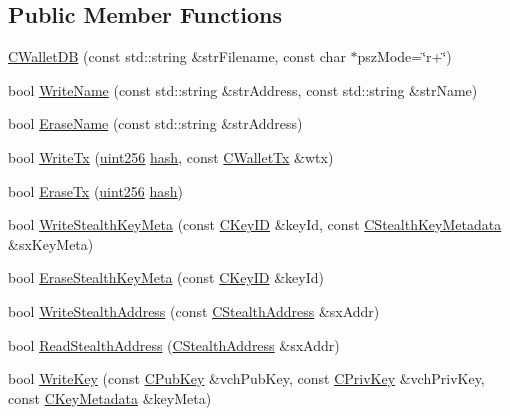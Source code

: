 \subsection*{Public Member Functions}
\begin{DoxyCompactItemize}
\item 
\hyperlink{class_c_wallet_d_b_abb8766ee5b03e8115438726c625f88a7}{C\+Wallet\+D\+B} (const std\+::string \&str\+Filename, const char $\ast$psz\+Mode=\char`\"{}r+\char`\"{})
\item 
bool \hyperlink{class_c_wallet_d_b_ad1b3bce77e9dd6ddd8c668a469c38f0a}{Write\+Name} (const std\+::string \&str\+Address, const std\+::string \&str\+Name)
\item 
bool \hyperlink{class_c_wallet_d_b_a319209fcf90ea860b668b92c44a3fa7a}{Erase\+Name} (const std\+::string \&str\+Address)
\item 
bool \hyperlink{class_c_wallet_d_b_a76d2ca02898221ab66df5d5f7491164e}{Write\+Tx} (\hyperlink{classuint256}{uint256} \hyperlink{cache_8cc_a11ecb029164e055f28f4123ce3748862}{hash}, const \hyperlink{class_c_wallet_tx}{C\+Wallet\+Tx} \&wtx)
\item 
bool \hyperlink{class_c_wallet_d_b_a498e00c693cacc4b558e6f5295ea32f2}{Erase\+Tx} (\hyperlink{classuint256}{uint256} \hyperlink{cache_8cc_a11ecb029164e055f28f4123ce3748862}{hash})
\item 
bool \hyperlink{class_c_wallet_d_b_a68428260802d8acd1a6f87f92b991841}{Write\+Stealth\+Key\+Meta} (const \hyperlink{class_c_key_i_d}{C\+Key\+I\+D} \&key\+Id, const \hyperlink{class_c_stealth_key_metadata}{C\+Stealth\+Key\+Metadata} \&sx\+Key\+Meta)
\item 
bool \hyperlink{class_c_wallet_d_b_a401ec8ec6c7e38cf87be9b92f95052a4}{Erase\+Stealth\+Key\+Meta} (const \hyperlink{class_c_key_i_d}{C\+Key\+I\+D} \&key\+Id)
\item 
bool \hyperlink{class_c_wallet_d_b_a2bce6f7f050d6d14e2c025a7beba2cfc}{Write\+Stealth\+Address} (const \hyperlink{class_c_stealth_address}{C\+Stealth\+Address} \&sx\+Addr)
\item 
bool \hyperlink{class_c_wallet_d_b_aebcc02069f91916c652d4e3e13be0f0b}{Read\+Stealth\+Address} (\hyperlink{class_c_stealth_address}{C\+Stealth\+Address} \&sx\+Addr)
\item 
bool \hyperlink{class_c_wallet_d_b_a7ebef5e0c7f604aa2159ba96d527e3a2}{Write\+Key} (const \hyperlink{class_c_pub_key}{C\+Pub\+Key} \&vch\+Pub\+Key, const \hyperlink{key_8h_a1da569b8b6e5b3fa1196cc1b877e7f54}{C\+Priv\+Key} \&vch\+Priv\+Key, const \hyperlink{class_c_key_metadata}{C\+Key\+Metadata} \&key\+Meta)

\end{DoxyCompactItemize}
